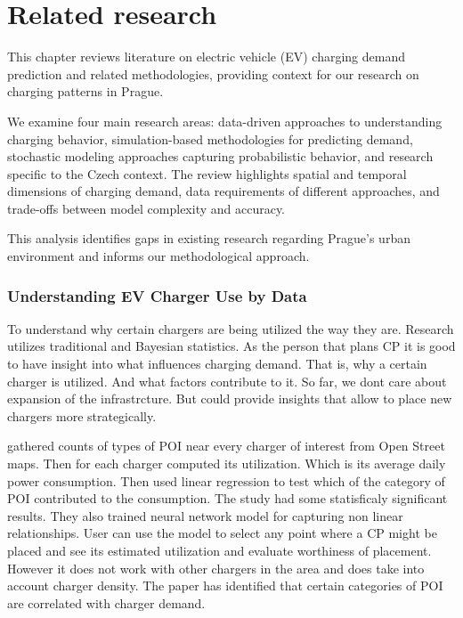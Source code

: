 \setchapterpreamble[u]{\margintoc}

\chapter{Related research}

This chapter reviews literature on electric vehicle (EV) charging demand prediction and related methodologies, providing context for our research on charging patterns in Prague.

We examine four main research areas: data-driven approaches to understanding charging behavior, simulation-based methodologies for predicting demand, stochastic modeling approaches capturing probabilistic behavior, and research specific to the Czech context. The review highlights spatial and temporal dimensions of charging demand, data requirements of different approaches, and trade-offs between model complexity and accuracy.

This analysis identifies gaps in existing research regarding Prague's urban environment and informs our methodological approach.



\subsection{Understanding EV Charger Use by Data}

To understand why certain chargers are being utilized the way they are. Research utilizes traditional and Bayesian statistics. As the person that plans \acrfull{CP} it is good to have insight into what influences charging demand. That is, why a certain charger is utilized. And what factors contribute to it. So far, we dont care about expansion of the infrastrcture. But could provide insights that allow to place new chargers more strategically.

 gathered counts of types of \acrfull{POI} near every charger of interest  from Open Street maps. Then for each charger computed its utilization. Which is its average daily power consumption. Then used linear regression to test which of the category of \acrfull{POI} contributed to the consumption.
The study had some statisficaly significant results. They also trained neural network model for capturing non linear relationships. User can use the model to select any point where a \acrfull{CP} might be placed and see its estimated utilization and evaluate worthiness of placement. However it does not work with other chargers in the area and does take into account charger density. The paper has identified that certain categories of \acrfull{POI} are correlated with charger demand.

